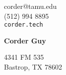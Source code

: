 \documentclass[12pt]{article}
\begin{document}

\noindent
\begin{minipage}{0.3\linewidth}
  \begin{flushleft}
    corder@tamu.edu\\
    (512) 994 8895\\
    \verb|corder.tech|
  \end{flushleft}
\end{minipage}
\hfill
\begin{minipage}{0.3\linewidth}
  \begin{center}
    {\Huge\textbf{Corder Guy}}
  \end{center}
\end{minipage}
\hfill
\begin{minipage}{0.3\linewidth}
  \begin{flushright}
    4341 FM 535 \\
    Bastrop, TX 78602 \\
  \end{flushright}
\end{minipage}

\end{document}
